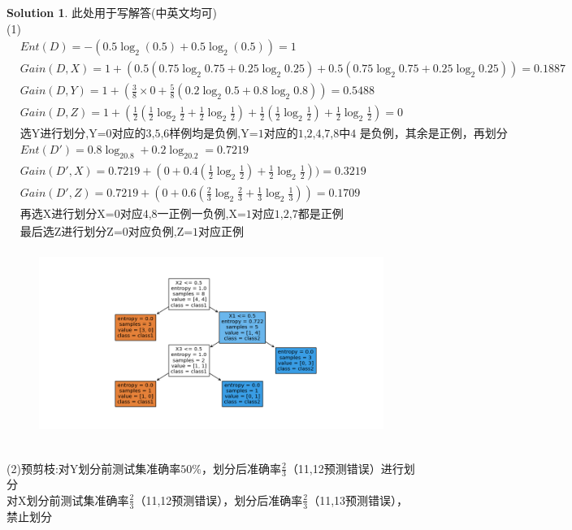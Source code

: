 \documentclass[a4paper,UTF8]{article}
\numberwithin{equation}{section}
\theoremstyle{definition}
\newtheorem*{solution}{Solution}
\begin{document}
\newpage
\begin{solution}
此处用于写解答(中英文均可)
~\\
(1)
\begin{align*}
	&Ent(D)=-(0.5\log_2(0.5)+0.5 \log_2(0.5))=1\\
	&Gain(D,X)=1+(0.5(0.75 \log_2 0.75+0.25 \log_2 0.25)+0.5(0.75 \log_2 0.75+0.25 \log_2 0.25))=0.1887\\
	&Gain(D,Y)=1+(\frac{3}{8}\times0+\frac{5}{8}(0.2\log_2 0.5+0.8 \log_2 0.8))=0.5488\\
	&Gain(D,Z)=1+(\frac{1}{2}(\frac{1}{2}\log_2 \frac{1}{2}+\frac{1}{2}\log_2 \frac{1}{2})+\frac{1}{2}(\frac{1}{2}\log_2 \frac{1}{2})+\frac{1}{2}\log_2 \frac{1}{2})=0\\
	&\mbox{选Y进行划分,Y=0对应的3,5,6样例均是负例,Y=1对应的1,2,4,7,8中4
	是负例，其余是正例，再划分}\\
	&Ent(D')=0.8\log_20.8+0.2\log_20.2=0.7219\\
	&Gain(D',X)=0.7219+(0+0.4(\frac{1}{2}\log_2 \frac{1}{2})+\frac{1}{2}\log_2 \frac{1}{2}))=0.3219\\
	&Gain(D',Z)=0.7219+(0+0.6(\frac{2}{3}\log_2 \frac{2}{3}+\frac{1}{3}\log_2\frac{1}{3}))=0.1709\\
	&\mbox{再选X进行划分X=0对应4,8一正例一负例,X=1对应1,2,7都是正例}\\
	&\mbox{最后选Z进行划分Z=0对应负例,Z=1对应正例}\\
\end{align*}
\begin{figure}[htbp]
	\centering
	\includegraphics[scale=0.7]{Q4tree.png}
\end{figure}\\
(2)预剪枝:对Y划分前测试集准确率$50\% $，划分后准确率$\frac{2}{3}$（11,12预测错误）进行划分\\
对X划分前测试集准确率$\frac{2}{3}$（11,12预测错误），划分后准确率$\frac{2}{3}$（11,13预测错误），禁止划分\\

\end{solution}
\end{document}
